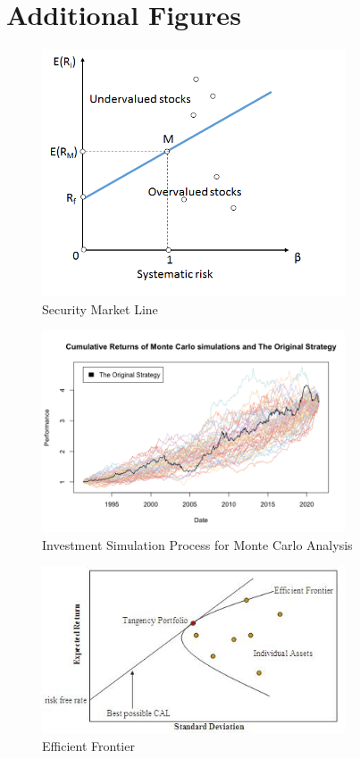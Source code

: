 \appendix

\section{Additional Figures}

\begin{figure}[h!]
    \centering
    \includegraphics[width=0.8\textwidth]{../Figures/SML.png}
    \caption{Security Market Line}
    \label{fig:SML_appendix}
\end{figure}

\begin{figure}[h!]
    \centering
    \includegraphics[width=0.8\textwidth]{../Figures/investment_simulation_process.png}
    \caption{Investment Simulation Process for Monte Carlo Analysis}
    \label{fig:investment_simulation_appendix}
\end{figure}

\begin{figure}[h!]
    \centering
    \includegraphics[width=0.8\textwidth]{../Figures/efficient_frontier.png}
    \caption{Efficient Frontier}
    \label{fig:efficient_frontier_appendix}
\end{figure}

\newpage
